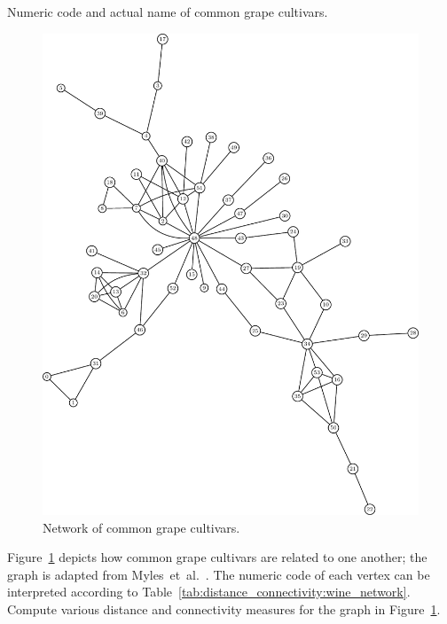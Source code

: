 \begin{problem}
\begin{table}[!htbp]
\centering
{}

\caption{Numeric code and actual name of common grape cultivars.}
\label{tab:distance_connectivity:wine_network}
\end{table}

\begin{figure}[!htbp]
\centering
{}
\includegraphics{image/distance-connectivity/wine-network}
\caption{Network of common grape cultivars.}
\label{fig:distance_connectivity:wine_network}
\end{figure}

\item Figure~\ref{fig:distance_connectivity:wine_network} depicts how
  common grape cultivars are related to one another; the
  graph is adapted from Myles~et~al.~\cite{MylesEtAl2011}. The numeric
  code of each vertex can be interpreted according to
  Table~\ref{tab:distance_connectivity:wine_network}. Compute various
  distance and connectivity measures for the graph in
  Figure~\ref{fig:distance_connectivity:wine_network}.


\end{problem}
